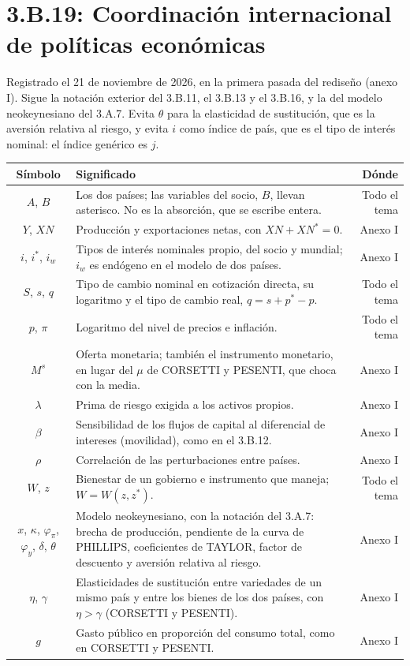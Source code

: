 \documentclass[10pt,a4paper]{article}
\newcommand{\cabecera}{\toprule\textbf{Símbolo} & \textbf{Significado} & \textbf{Dónde}\\\midrule\endhead\bottomrule\endfoot}
\begin{document}
\section{3.B.19: Coordinación internacional de políticas económicas}
Registrado el 21 de noviembre de 2026, en la primera pasada del rediseño (anexo I). Sigue la notación exterior del 3.B.11, el 3.B.13 y el 3.B.16, y la del modelo neokeynesiano del 3.A.7. Evita $\theta$ para la elasticidad de sustitución, que es la aversión relativa al riesgo, y evita $i$ como índice de país, que es el tipo de interés nominal: el índice genérico es $j$.
\begin{longtable}{SMD}
\cabecera
$A$, $B$ & Los dos países; las variables del socio, $B$, llevan asterisco. No es la absorción, que se escribe entera. & Todo el tema\\
$Y$, $XN$ & Producción y exportaciones netas, con $XN+XN^{*}=0$. & Anexo I\\
$i$, $i^{*}$, $i_w$ & Tipos de interés nominales propio, del socio y mundial; $i_w$ es endógeno en el modelo de dos países. & Anexo I\\
$S$, $s$, $q$ & Tipo de cambio nominal en cotización directa, su logaritmo y el tipo de cambio real, $q=s+p^{*}-p$. & Todo el tema\\
$p$, $\pi$ & Logaritmo del nivel de precios e inflación. & Todo el tema\\
$M^{s}$ & Oferta monetaria; también el instrumento monetario, en lugar del $\mu$ de CORSETTI y PESENTI, que choca con la media. & Anexo I\\
$\lambda$ & Prima de riesgo exigida a los activos propios. & Anexo I\\
$\beta$ & Sensibilidad de los flujos de capital al diferencial de intereses (movilidad), como en el 3.B.12. & Anexo I\\
$\rho$ & Correlación de las perturbaciones entre países. & Anexo I\\
$W$, $z$ & Bienestar de un gobierno e instrumento que maneja; $W=W(z,z^{*})$. & Todo el tema\\
$x$, $\kappa$, $\varphi_\pi$, $\varphi_y$, $\delta$, $\theta$ & Modelo neokeynesiano, con la notación del 3.A.7: brecha de producción, pendiente de la curva de PHILLIPS, coeficientes de TAYLOR, factor de descuento y aversión relativa al riesgo. & Anexo I\\
$\eta$, $\gamma$ & Elasticidades de sustitución entre variedades de un mismo país y entre los bienes de los dos países, con $\eta>\gamma$ (CORSETTI y PESENTI). & Anexo I\\
$g$ & Gasto público en proporción del consumo total, como en CORSETTI y PESENTI. & Anexo I\\
\end{longtable}
\end{document}
